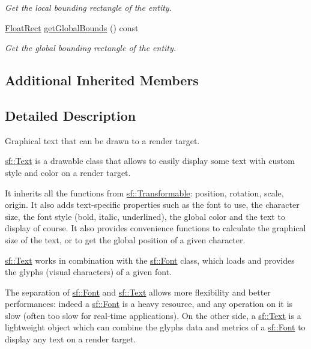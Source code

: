 \begin{DoxyCompactItemize}
\begin{DoxyCompactList}\small\item\em Get the local bounding rectangle of the entity. \end{DoxyCompactList}\item 
\hyperlink{classsf_1_1Rect}{Float\-Rect} \hyperlink{classsf_1_1Text_a95d732f58bd12bf7ec388b106f3729ba}{get\-Global\-Bounds} () const 
\begin{DoxyCompactList}\small\item\em Get the global bounding rectangle of the entity. \end{DoxyCompactList}\end{DoxyCompactItemize}
\subsection*{Additional Inherited Members}


\subsection{Detailed Description}
Graphical text that can be drawn to a render target. 

\hyperlink{classsf_1_1Text}{sf\-::\-Text} is a drawable class that allows to easily display some text with custom style and color on a render target.

It inherits all the functions from \hyperlink{classsf_1_1Transformable}{sf\-::\-Transformable}\-: position, rotation, scale, origin. It also adds text-\/specific properties such as the font to use, the character size, the font style (bold, italic, underlined), the global color and the text to display of course. It also provides convenience functions to calculate the graphical size of the text, or to get the global position of a given character.

\hyperlink{classsf_1_1Text}{sf\-::\-Text} works in combination with the \hyperlink{classsf_1_1Font}{sf\-::\-Font} class, which loads and provides the glyphs (visual characters) of a given font.

The separation of \hyperlink{classsf_1_1Font}{sf\-::\-Font} and \hyperlink{classsf_1_1Text}{sf\-::\-Text} allows more flexibility and better performances\-: indeed a \hyperlink{classsf_1_1Font}{sf\-::\-Font} is a heavy resource, and any operation on it is slow (often too slow for real-\/time applications). On the other side, a \hyperlink{classsf_1_1Text}{sf\-::\-Text} is a lightweight object which can combine the glyphs data and metrics of a \hyperlink{classsf_1_1Font}{sf\-::\-Font} to display any text on a render target.

